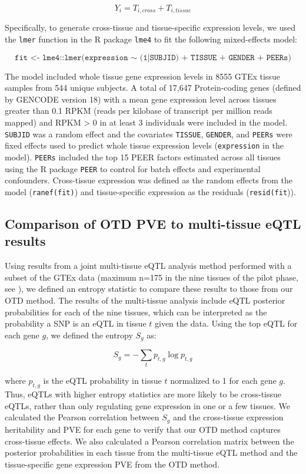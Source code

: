 \documentclass[10pt,letterpaper]{article}
\begin{document}
\[ Y_i = T_{i,cross} + T_{i,tissue} \]

Specifically, to generate cross-tissue and tissue-specific expression
levels, we used the \texttt{lmer} function in the R \cite{R_Core_Team_2015} package
\texttt{lme4} \cite{Bates_2015a} to fit the following mixed-effects model:

\[ \texttt{fit <- lme4::lmer(expression $\sim$ (1|SUBJID) + TISSUE + GENDER + PEERs)} \]

The model included whole tissue gene expression levels in 8555 GTEx
tissue samples from 544 unique subjects. A total of 17,647
Protein-coding genes (defined by GENCODE \cite{Harrow_2012} version 18) with a
mean gene expression level across tissues greater than 0.1 RPKM (reads
per kilobase of transcript per million reads mapped) and RPKM > 0 in at least 3 individuals were included in
the model. \texttt{SUBJID} was a random effect and the covariates
\texttt{TISSUE}, \texttt{GENDER}, and \texttt{PEERs} were fixed effects
used to predict whole tissue expression levels (\texttt{expression} in
the model). \texttt{PEERs} included the top 15 PEER factors estimated
across all tissues using the R package \texttt{PEER} \cite{Stegle_2012} to control
for batch effects and experimental confounders. Cross-tissue expression
was defined as the random effects from the model (\texttt{ranef(fit)})
and tissue-specific expression as the residuals (\texttt{resid(fit})).

\subsection*{Comparison of OTD PVE to multi-tissue eQTL
results}\label{comparison-of-otd-pve-to-multi-tissue-eqtl-results}

Using results from a joint multi-tissue eQTL analysis method \cite{Flutre_2013}
performed with a subset of the GTEx data (maximum n=175 in the nine
tissues of the pilot phase, see \cite{Ardlie_2015}), we defined an entropy
statistic to compare these results to those from our OTD method. The
results of the multi-tissue analysis include eQTL posterior
probabilities for each of the nine tissues, which can be interpreted as
the probability a SNP is an eQTL in tissue \(t\) given the data. Using
the top eQTL for each gene \(g\), we defined the entropy \(S_g\) as:

\[ S_g = -\sum_{t}p_{t,g} \log p_{t,g} \]

where \(p_{t,g}\) is the eQTL probability in tissue \(t\) normalized to
1 for each gene \(g\). Thus, eQTLs with higher entropy statistics are
more likely to be cross-tissue eQTLs, rather than only regulating gene
expression in one or a few tissues. We calculated the Pearson
correlation between \(S_g\) and the cross-tissue expression heritability
and PVE for each gene to verify that our OTD method captures
cross-tissue effects. We also calculated a Pearson correlation matrix
between the posterior probabilities in each tissue from the multi-tissue
eQTL method and the tissue-specific gene expression PVE from the OTD
method.
\end{document}
